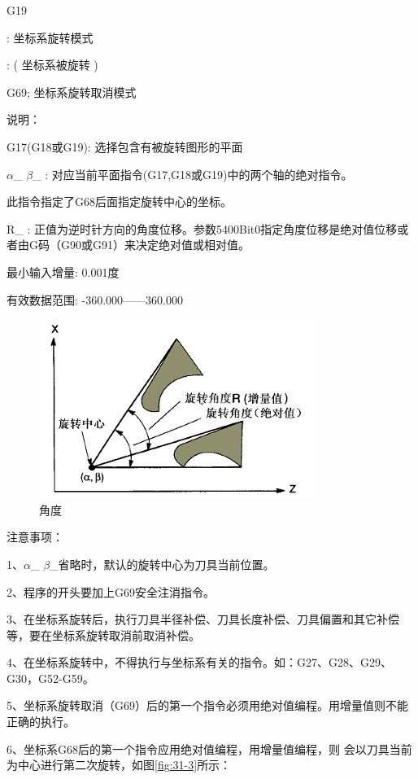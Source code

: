 G19

:                  坐标系旋转模式 

:                  ( 坐标系被旋转 )

G69;                坐标系旋转取消模式

说明：

G17(G18或G19): 选择包含有被旋转图形的平面

$\alpha$\_ $\beta$\_ :         对应当前平面指令(G17,G18或G19)中的两个轴的绝对指令。

此指令指定了G68后面指定旋转中心的坐标。

R\_    :         正值为逆时针方向的角度位移。参数5400Bit0指定角度位移是绝对值位移或者由G码（G90或G91）来决定绝对值或相对值。

最小输入增量: 0.001度

有效数据范围: -360.000------360.000
\begin{figure}[h]
	\centering
	\includegraphics[width=0.7\linewidth,trim=0 0 0 0,clip]{data/image/31-2}
	\caption{角度}
	\label{fig:31-2}
\end{figure}	

注意事项：

1、$\alpha$\_ $\beta$\_省略时，默认的旋转中心为刀具当前位置。

2、程序的开头要加上G69安全注消指令。

3、在坐标系旋转后，执行刀具半径补偿、刀具长度补偿、刀具偏置和其它补偿等，要在坐标系旋转取消前取消补偿。

4、在坐标系旋转中，不得执行与坐标系有关的指令。如：G27、G28、G29、G30，G52-G59。

5、坐标系旋转取消（G69）后的第一个指令必须用绝对值编程。用增量值则不能正确的执行。

6、坐标系G68后的第一个指令应用绝对值编程，用增量值编程，则    会以刀具当前为中心进行第二次旋转，如图\ref{fig:31-3}所示：

